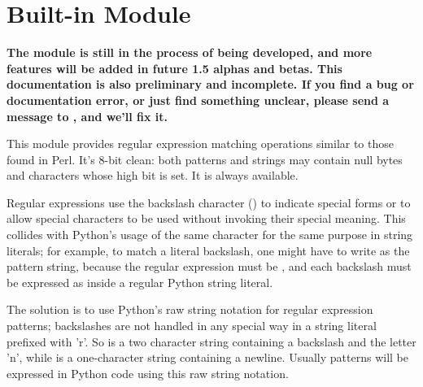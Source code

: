 \section{Built-in Module }
\label{module-re}


{\large\bf The  module is still in the process of being
developed, and more features will be added in future 1.5 alphas and
betas.  This documentation is also preliminary and incomplete.  If you
find a bug or documentation error, or just find something unclear,
please send a message to
, and we'll fix it.}

This module provides regular expression matching operations similar to
those found in Perl.  It's 8-bit
clean: both patterns and strings may contain null bytes and characters
whose high bit is set.  It is always available.  

Regular expressions use the backslash character (\code{\e}) to
indicate special forms or to allow special characters to be used
without invoking their special meaning.  This collides with Python's
usage of the same character for the same purpose in string literals;
for example, to match a literal backslash, one might have to write
\code{\e\e\e\e} as the pattern string, because the regular expression must be \code{\e\e}, and each backslash must be expressed as \code{\e\e} inside a regular Python string literal.

The solution is to use Python's raw string notation for regular
expression patterns; backslashes are not handled in any special way in
a string literal prefixed with 'r'.  So  is a two
character string containing a backslash and the letter 'n', while
 is a one-character string containing a newline.  Usually
patterns will be expressed in Python code using this raw string notation.



